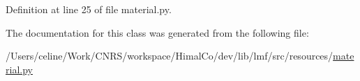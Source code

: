 Definition at line 25 of file material.\+py.



The documentation for this class was generated from the following file\+:\begin{DoxyCompactItemize}
\item 
/\+Users/celine/\+Work/\+C\+N\+R\+S/workspace/\+Himal\+Co/dev/lib/lmf/src/resources/\hyperlink{material_8py}{material.\+py}\end{DoxyCompactItemize}
